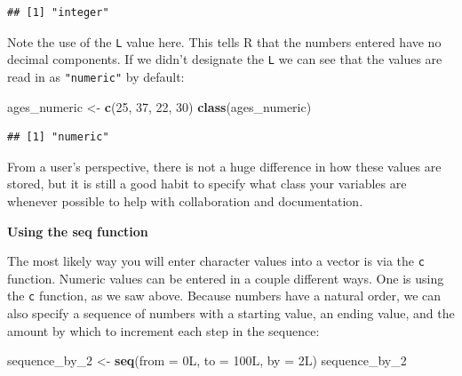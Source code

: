 \documentclass[]{tufte-book}
\newenvironment{Shaded}{\begin{snugshade}}{\end{snugshade}}
\newcommand{\AttributeTok}[1]{\textcolor[rgb]{0.13,0.29,0.53}{#1}}
\newcommand{\DataTypeTok}[1]{\textcolor[rgb]{0.13,0.29,0.53}{#1}}
\newcommand{\DecValTok}[1]{\textcolor[rgb]{0.00,0.00,0.81}{#1}}
\newcommand{\FunctionTok}[1]{\textcolor[rgb]{0.13,0.29,0.53}{\textbf{#1}}}
\newcommand{\NormalTok}[1]{#1}
\newcommand{\OtherTok}[1]{\textcolor[rgb]{0.56,0.35,0.01}{#1}}
\begin{document}
\begin{verbatim}
## [1] "integer"
\end{verbatim}

Note the use of the \texttt{L} value here. This tells R that the numbers entered have no decimal components. If we didn't designate the \texttt{L} we can see that the values are read in as \texttt{"numeric"} by default:

\begin{Shaded}
\begin{Highlighting}[]
\NormalTok{ages\_numeric }\OtherTok{\textless{}{-}} \FunctionTok{c}\NormalTok{(}\DecValTok{25}\NormalTok{, }\DecValTok{37}\NormalTok{, }\DecValTok{22}\NormalTok{, }\DecValTok{30}\NormalTok{)}
\FunctionTok{class}\NormalTok{(ages\_numeric)}
\end{Highlighting}
\end{Shaded}

\begin{verbatim}
## [1] "numeric"
\end{verbatim}

From a user's perspective, there is not a huge difference in how these values are stored, but it is still a good habit to specify what class your variables are whenever possible to help with collaboration and documentation. \newline

\vspace*{0.2in}

\noindent\textbf{Using the seq function}\vspace*{0.1in}

The most likely way you will enter character values into a vector is via the \texttt{c} function. Numeric values can be entered in a couple different ways. One is using the \texttt{c} function, as we saw above. Because numbers have a natural order, we can also specify a sequence of numbers with a starting value, an ending value, and the amount by which to increment each step in the sequence:

\begin{Shaded}
\begin{Highlighting}[]
\NormalTok{sequence\_by\_2 }\OtherTok{\textless{}{-}} \FunctionTok{seq}\NormalTok{(}\AttributeTok{from =} \DecValTok{0}\DataTypeTok{L}\NormalTok{, }\AttributeTok{to =} \DecValTok{100}\DataTypeTok{L}\NormalTok{, }\AttributeTok{by =} \DecValTok{2}\DataTypeTok{L}\NormalTok{)}
\NormalTok{sequence\_by\_2}
\end{Highlighting}
\end{Shaded}
\end{document}
